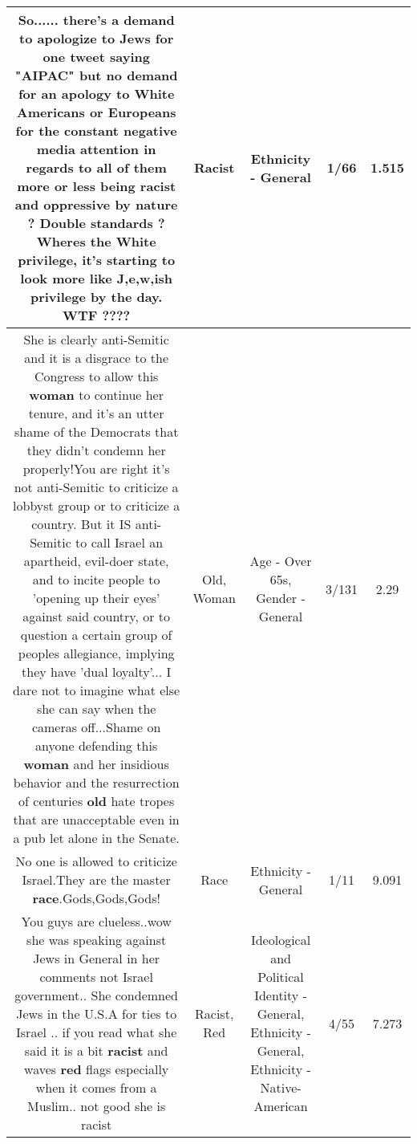 \documentclass[11pt]{article}
\newlength\mylength
\begin{document}
\begin{center}
\begin{longtable}{|C{.65\mylength}|C{.30\mylength}|C{.12\mylength}|C{.12\mylength}|C{.12\mylength}|}
  \small So...... there's a demand to apologize to Jews for one tweet saying "AIPAC"  but no demand for an apology to White Americans or Europeans for the constant negative media attention in regards to all of them more or less being \textbf{racist} and oppressive by nature ? Double standards ? Wheres the White privilege, it's starting to look more like J,e,w,ish privilege by the day. WTF ????\normalsize   & Racist & Ethnicity - General & 1/66 & 1.515 \\  \hline
  \small She is clearly anti-Semitic and it is a disgrace to the Congress to allow this \textbf{woman} to continue her tenure, and it's an utter shame of the Democrats that they didn't condemn her properly!You are right it's not anti-Semitic to criticize a lobbyst group or to criticize a country. But it IS anti-Semitic to call Israel an apartheid, evil-doer state, and to incite people to 'opening up their eyes' against said country, or to question a certain group of peoples allegiance, implying they have 'dual loyalty'... I dare not to imagine what else she can say when the cameras off...Shame on anyone defending this \textbf{woman} and her insidious behavior and the resurrection of centuries \textbf{old} hate tropes that are unacceptable even in a pub let alone in the Senate.\normalsize   & Old, Woman & Age - Over 65s, Gender - General & 3/131 & 2.29 \\  \hline
  \small No one is allowed to criticize Israel.They are the master \textbf{race}.Gods,Gods,Gods!\normalsize   & Race & Ethnicity - General & 1/11 & 9.091 \\  \hline
  \small You guys are clueless..wow she was speaking against Jews in General in her comments not Israel  government.. She condemned Jews in the U.S.A for ties to Israel .. if you read what she said it is a bit \textbf{racist} and waves \textbf{r\textbf{ed}} flags especially when it comes from a Muslim.. not good she is racist\normalsize   & Racist, Red &  Ideological and Political Identity - General, Ethnicity - General, Ethnicity - Native-American & 4/55 & 7.273 \\  \hline

\end{longtable}
\end{center}
\end{document}

